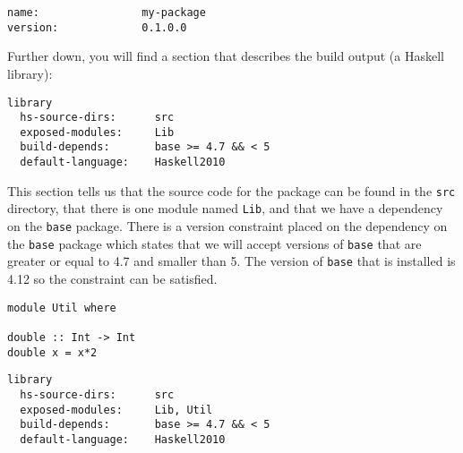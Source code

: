 \begin{verbatim}
name:                my-package
version:             0.1.0.0
\end{verbatim}
Further down, you will find a section that describes the build output (a Haskell library):
\begin{verbatim}
library
  hs-source-dirs:      src
  exposed-modules:     Lib
  build-depends:       base >= 4.7 && < 5
  default-language:    Haskell2010
\end{verbatim}
This section tells us that the source code for the package can be found in the \texttt{\small src} directory, that there is one module named \texttt{\small Lib}, and that we have a dependency on the \texttt{\small base} package. There is a version constraint placed on the dependency on the \texttt{\small base} package which states that we will accept versions of \texttt{\small base} that are greater or equal to 4.7 and smaller than 5. The version of \texttt{\small base} that is installed is 4.12 so the constraint can be satisfied.

\begin{verbatim}
module Util where 

double :: Int -> Int 
double x = x*2
\end{verbatim}
\begin{verbatim}
library
  hs-source-dirs:      src
  exposed-modules:     Lib, Util
  build-depends:       base >= 4.7 && < 5
  default-language:    Haskell2010
\end{verbatim}

